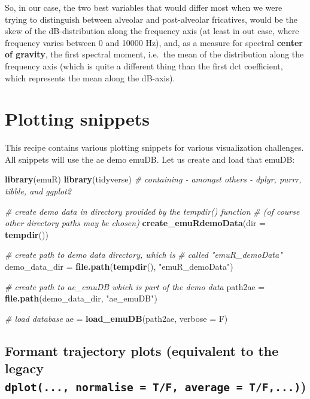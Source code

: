 \documentclass[]{book}
\newenvironment{Shaded}{\begin{snugshade}}{\end{snugshade}}
\newcommand{\CommentTok}[1]{\textcolor[rgb]{0.56,0.35,0.01}{\textit{#1}}}
\newcommand{\DataTypeTok}[1]{\textcolor[rgb]{0.13,0.29,0.53}{#1}}
\newcommand{\KeywordTok}[1]{\textcolor[rgb]{0.13,0.29,0.53}{\textbf{#1}}}
\newcommand{\NormalTok}[1]{#1}
\newcommand{\StringTok}[1]{\textcolor[rgb]{0.31,0.60,0.02}{#1}}
\begin{document}
So, in our case, the two best variables that would differ most when we were trying to distinguish between alveolar and post-alveolar fricatives, would be the skew of the dB-distribution along the frequency axis (at least in out case, where frequency varies between 0 and 10000 Hz), and, as a measure for spectral \textbf{center of gravity}, the first spectral moment, i.e.~the mean of the distribution along the frequency axis (which is quite a different thing than the first dct coefficient, which represents the mean along the dB-axis).

\hypertarget{recipe:plottingSnippets}{%
\chapter{Plotting snippets}\label{recipe:plottingSnippets}}

This recipe contains various plotting snippets for various visualization challenges. All snippets will use the ae demo emuDB. Let us create and load that emuDB:

\begin{Shaded}
\begin{Highlighting}[]
\KeywordTok{library}\NormalTok{(emuR)}
\KeywordTok{library}\NormalTok{(tidyverse) }\CommentTok{# containing - amongst others - dplyr, purrr, tibble, and ggplot2}

\CommentTok{# create demo data in directory provided by the tempdir() function}
\CommentTok{# (of course other directory paths may be chosen)}
\KeywordTok{create_emuRdemoData}\NormalTok{(}\DataTypeTok{dir =} \KeywordTok{tempdir}\NormalTok{())}

\CommentTok{# create path to demo data directory, which is}
\CommentTok{# called "emuR_demoData"}
\NormalTok{demo_data_dir =}\StringTok{ }\KeywordTok{file.path}\NormalTok{(}\KeywordTok{tempdir}\NormalTok{(), }
                          \StringTok{"emuR_demoData"}\NormalTok{)}

\CommentTok{# create path to ae_emuDB which is part of the demo data}
\NormalTok{path2ae =}\StringTok{ }\KeywordTok{file.path}\NormalTok{(demo_data_dir, }
                    \StringTok{"ae_emuDB"}\NormalTok{)}

\CommentTok{# load database}
\NormalTok{ae =}\StringTok{ }\KeywordTok{load_emuDB}\NormalTok{(path2ae, }\DataTypeTok{verbose =}\NormalTok{ F)}
\end{Highlighting}
\end{Shaded}

\hypertarget{formant-trajectory-plots-equivalent-to-the-legacy-dplot...-normalise-tf-average-tf...}{%
\section{\texorpdfstring{Formant trajectory plots (equivalent to the legacy \texttt{dplot(...,\ normalise\ =\ T/F,\ average\ =\ T/F,...)})}{Formant trajectory plots (equivalent to the legacy dplot(..., normalise = T/F, average = T/F,...))}}\label{formant-trajectory-plots-equivalent-to-the-legacy-dplot...-normalise-tf-average-tf...}}
\end{document}

